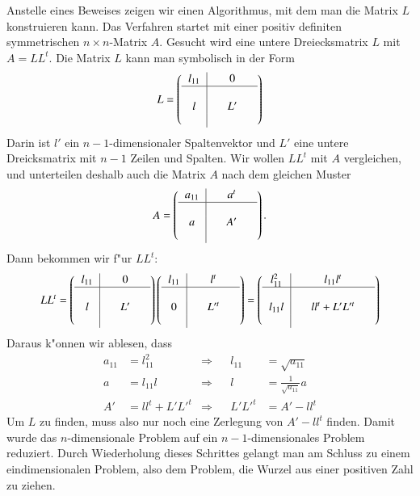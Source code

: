 Anstelle eines Beweises zeigen wir einen Algorithmus, mit dem man die Matrix
$L$ konstruieren kann.
Das Verfahren startet mit einer positiv definiten
symmetrischen $n\times n$-Matrix $A$.
Gesucht wird eine untere Dreiecksmatrix $L$
mit $A=LL^t$.
Die Matrix $L$ kann man symbolisch in der Form 
\[
L=\left(
\begin{tabular}{>{$}c<{$}|>{$}c<{$}>{$}c<{$}>{$}c<{$}}
l_{11}&&0&\\
\hline
&&&\\
l&&L'&\\
&&&
\end{tabular}
\right)
\]
Darin ist $l'$ ein $n-1$-dimensionaler Spaltenvektor und $L'$ eine
untere Dreicksmatrix mit $n-1$ Zeilen und Spalten.
Wir wollen $LL^t$ mit $A$ vergleichen, und unterteilen deshalb auch die
Matrix $A$ nach dem gleichen Muster
\[
A=\left(
\begin{tabular}{>{$}c<{$}|>{$}c<{$}>{$}c<{$}>{$}c<{$}}
a_{11}&&a^t&\\
\hline
&&&\\
a&&A'&\\
&&&
\end{tabular}
\right).
\]
Dann bekommen wir f"ur $LL^t$:
\[
LL^t=
\left(
\begin{tabular}{>{$}c<{$}|>{$}c<{$}>{$}c<{$}>{$}c<{$}}
l_{11}&&0&\\
\hline
&&&\\
l&&L'&\\
&&&
\end{tabular}
\right)
\left(
\begin{tabular}{>{$}c<{$}|>{$}c<{$}>{$}c<{$}>{$}c<{$}}
l_{11}&&l^t&\\
\hline
&&&\\
0&&L'^t&\\
&&&
\end{tabular}
\right)
=
\left(
\begin{tabular}{>{$}c<{$}|>{$}c<{$}>{$}c<{$}>{$}c<{$}}
l_{11}^2&&l_{11}l^t&\\
\hline
&&&\\
l_{11}l&&ll^t+L'L'^t&\\
&&&
\end{tabular}
\right)
\]
Daraus k"onnen wir ablesen, dass 
\begin{align*}
a_{11}&=l_{11}^2   &\Rightarrow&&l_{11}&=\sqrt{a_{11}}\\
     a&=l_{11}l    &\Rightarrow&&     l&=\frac1{\sqrt{a_{11}}}a\\
    A'&=ll^t+L'L'^t&\Rightarrow&&L'L'^t&=A'-ll^t
\end{align*}
Um $L$ zu finden, muss also nur noch eine Zerlegung von $A'-ll^t$
finden.
Damit wurde das $n$-dimensionale Problem auf ein $n-1$-dimensionales
Problem reduziert.
Durch Wiederholung dieses Schrittes gelangt man am Schluss
zu einem eindimensionalen Problem, also dem Problem, die Wurzel aus einer
positiven Zahl zu ziehen.

